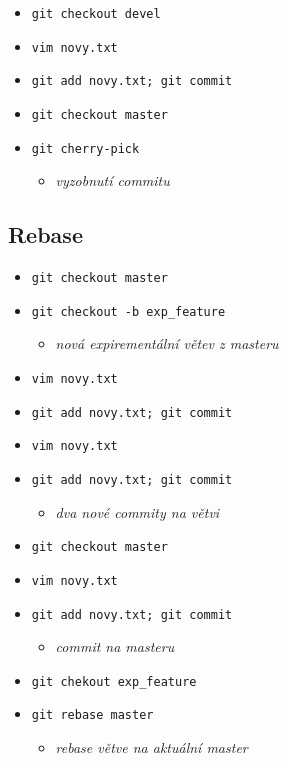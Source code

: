 \documentclass[10pt,twocolumn]{article}
\begin{document}
\begin{itemize}
  \item \texttt{git checkout devel}
  \item \texttt{vim novy.txt}
  \item \texttt{git add novy.txt; git commit}
  \item \texttt{git checkout master}
  \item \texttt{git cherry-pick}
  \begin{itemize} \item \textit{vyzobnutí commitu} \end{itemize}
\end{itemize}

\subsection{Rebase}

\begin{itemize}
	\item \texttt{git checkout master}
	\item \texttt{git checkout -b exp\_feature}
	\begin{itemize} \item \textit{nová expirementální větev z masteru} \end{itemize}
	\item \texttt{vim novy.txt}
	\item \texttt{git add novy.txt; git commit}
	\item \texttt{vim novy.txt}
	\item \texttt{git add novy.txt; git commit}
	\begin{itemize} \item \textit{dva nové commity na větvi} \end{itemize}
	\item \texttt{git checkout master}
	\item \texttt{vim novy.txt}
	\item \texttt{git add novy.txt; git commit}
	\begin{itemize} \item \textit{commit na masteru} \end{itemize}
	\item \texttt{git chekout exp\_feature}
	\item \texttt{git rebase master}
	\begin{itemize} \item \textit{rebase větve na aktuální master} \end{itemize}
\end{itemize}
\end{document}
